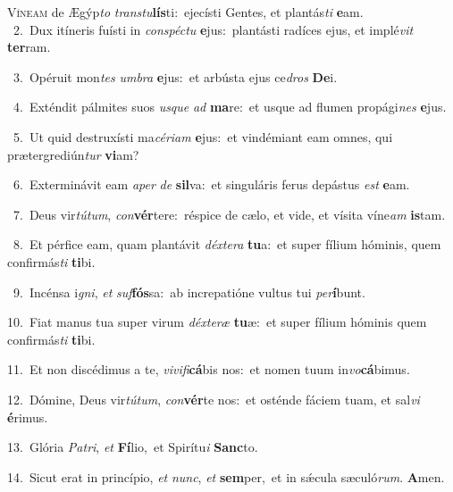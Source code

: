 \lettrine{\initial\textcolor{\initialcolor}{V}}{íneam} de Ægýp\textit{to} \textit{trans}\-\textit{tu}\textbf{lís}ti:~\star ejecísti Gentes, et plantás\textit{ti} \textbf{e}\-am.\\
{\numbfont\textcolor{\numbcolor}{~2.}}~Dux itíneris fuísti in \textit{con}\-\textit{spéc}\textit{tu} \textbf{e}\-jus:~\star plantásti radíces ejus, et implé\textit{vit} \textbf{ter}\-ram.\par
{\numbfont\textcolor{\numbcolor}{~3.}}~Opéruit mon\textit{tes} \textit{um}\-\textit{bra} \textbf{e}\-jus:~\star et arbústa ejus ce\textit{dros} \textbf{De}\-i.\par
{\numbfont\textcolor{\numbcolor}{~4.}}~Exténdit pálmites suos \textit{us}\-\textit{que} \textit{ad} \textbf{ma}\-re:~\star et usque ad flumen propági\textit{nes} \textbf{e}\-jus.\par
{\numbfont\textcolor{\numbcolor}{~5.}}~Ut quid destruxísti ma\-\textit{cé}\-\textit{ri}\textit{am} \textbf{e}\-jus:~\star et vindémiant eam omnes, qui prætergrediún\textit{tur} \textbf{vi}\-am?\par
{\numbfont\textcolor{\numbcolor}{~6.}}~Exterminávit eam \textit{a}\-\textit{per} \textit{de} \textbf{sil}\-va:~\star et singuláris ferus depástus \textit{est} \textbf{e}\-am.\par
{\numbfont\textcolor{\numbcolor}{~7.}}~Deus vir\-\textit{tú}\-\textit{tum}, \textit{con}\-\textbf{vér}tere:~\star réspice de cælo, et vide, et vísita víne\textit{am} \textbf{is}\-tam.\par
{\numbfont\textcolor{\numbcolor}{~8.}}~Et pérfice eam, quam plantávit \textit{déx}\-\textit{te}\textit{ra} \textbf{tu}\-a:~\star et super fílium hóminis, quem confirmás\textit{ti} \textbf{ti}\-bi.\par
{\numbfont\textcolor{\numbcolor}{~9.}}~Incénsa i\-\textit{gni}\-, \textit{et} \textit{suf}\-\textbf{fós}sa:~\star ab increpatióne vultus tui \textit{per}\-\textbf{í}bunt.\par
{\numbfont\textcolor{\numbcolor}{10.}}~Fiat manus tua super virum \textit{déx}\-\textit{te}\textit{ræ} \textbf{tu}\-æ:~\star et super fílium hóminis quem confirmás\textit{ti} \textbf{ti}\-bi.\par
{\numbfont\textcolor{\numbcolor}{11.}}~Et non discédimus a te, \textit{vi}\-\textit{vi}\textit{fi}\textbf{cá}bis nos:~\star et nomen tuum in\-\textit{vo}\-\textbf{cá}bimus.\par
{\numbfont\textcolor{\numbcolor}{12.}}~Dómine, Deus vir\-\textit{tú}\-\textit{tum}, \textit{con}\-\textbf{vér}te nos:~\star et osténde fáciem tuam, et sal\textit{vi} \textbf{é}\-rimus.\par
{\numbfont\textcolor{\numbcolor}{13.}}~Glória \textit{Pa}\-\textit{tri}, \textit{et} \textbf{Fí}\-lio,~\star et Spirítu\textit{i} \textbf{Sanc}\-to.\par
{\numbfont\textcolor{\numbcolor}{14.}}~Sicut erat in princípio, \textit{et} \textit{nunc}\-, \textit{et} \textbf{sem}\-per,~\star et in sǽcula sæculó\-\textit{rum}\-. \textbf{A}\-men.\par
